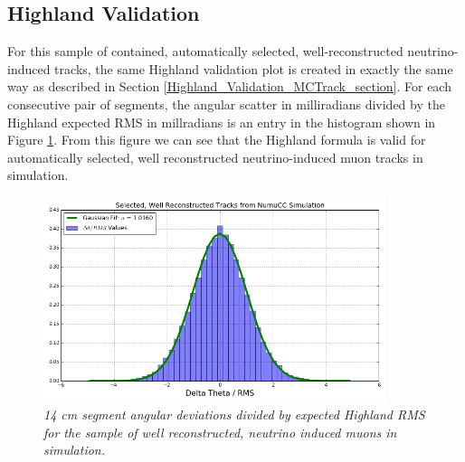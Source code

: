 \subsection{Highland Validation}\label{Highland_Validation_MCBNBSelectedRecoTrack_section}
For this sample of contained, automatically selected, well-reconstructed neutrino-induced tracks, the same Highland validation plot is created in exactly the same way as described in Section \ref{Highland_Validation_MCTrack_section}. For each consecutive pair of segments, the angular scatter in milliradians divided by the Highland expected RMS in millradians is an entry in the histogram shown in Figure \ref{Highland_validation_MCBNBSelectedRecoTracks_fig}. From this figure we can see that the Highland formula is valid for automatically selected, well reconstructed neutrino-induced muon tracks in simulation.

\begin{figure}[ht!]
\begin{center}
\includegraphics[width=100mm]{Figures/Highland_validation_MCBNBSelectedRecoTrack.png}
\end{center}
\caption{\textit{14 cm segment angular deviations divided by expected Highland RMS for the sample of well reconstructed, neutrino induced muons in simulation.}}
\label{Highland_validation_MCBNBSelectedRecoTracks_fig}
\end{figure}